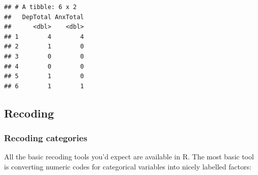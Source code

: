 \documentclass[
]{book}
\newenvironment{Shaded}{\begin{snugshade}}{\end{snugshade}}
\newcommand{\AttributeTok}[1]{\textcolor[rgb]{0.77,0.63,0.00}{#1}}
\newcommand{\CommentTok}[1]{\textcolor[rgb]{0.56,0.35,0.01}{\textit{#1}}}
\newcommand{\ConstantTok}[1]{\textcolor[rgb]{0.00,0.00,0.00}{#1}}
\newcommand{\DecValTok}[1]{\textcolor[rgb]{0.00,0.00,0.81}{#1}}
\newcommand{\FunctionTok}[1]{\textcolor[rgb]{0.00,0.00,0.00}{#1}}
\newcommand{\NormalTok}[1]{#1}
\newcommand{\OtherTok}[1]{\textcolor[rgb]{0.56,0.35,0.01}{#1}}
\newcommand{\SpecialCharTok}[1]{\textcolor[rgb]{0.00,0.00,0.00}{#1}}
\newcommand{\StringTok}[1]{\textcolor[rgb]{0.31,0.60,0.02}{#1}}
\begin{document}
\begin{Shaded}
\end{Shaded}

\begin{verbatim}
## # A tibble: 6 x 2
##   DepTotal AnxTotal
##      <dbl>    <dbl>
## 1        4        4
## 2        1        0
## 3        0        0
## 4        0        0
## 5        1        0
## 6        1        1
\end{verbatim}

\hypertarget{recoding-1}{%
\subsection{Recoding}\label{recoding-1}}

\hypertarget{recoding-categories}{%
\subsubsection{Recoding categories}\label{recoding-categories}}

All the basic recoding tools you'd expect are available in R. The most basic
tool is converting numeric codes for categorical variables into nicely
labelled factors:
\end{document}
